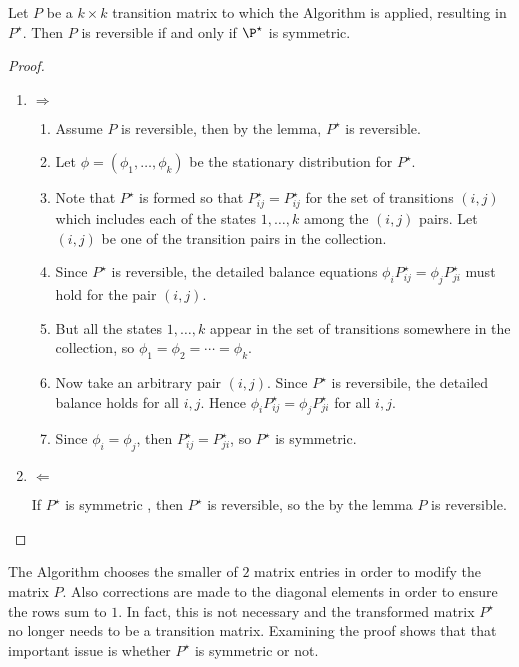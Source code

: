 \documentclass[12pt]{article}
\begin{document}
\begin{theorem}
  Let $P$ be a $k \times k$ transition matrix to which the Algorithm
  is applied, resulting in $P^{\star}$.  Then $P$ is reversible if and
  only if $\P^{\star}$ is symmetric.
\end{theorem}

\begin{proof}
  \begin{enumerate}
  \item $\Rightarrow$
    \begin{enumerate}
    \item Assume $P$ is reversible, then by the lemma, $P^{\star}$ is
      reversible.
    \item Let $\phi = (\phi_1, \dots, \phi_k)$ be the stationary
      distribution for $P^{\star}$.
    \item Note that $P^{\star}$ is formed so that $P_{ij}^{\star} =
      P_{ij}^{\star}$ for the set of transitions $(i,j)$ which
      includes each of the states $1, \dots, k$ among the $(i,j)$
      pairs.  Let $(i,j)$ be one of the transition pairs in the
      collection.
    \item Since $P^{\star}$ is reversible, the detailed balance
      equations  $\phi_i P_{ij}^{\star} = \phi_j
      P_{ji}^{\star}$ must hold for the pair $(i,j)$.
    \item But all the states $1, \dots, k$ appear in the set of
      transitions somewhere in the collection, so $\phi_1 = \phi_2 =
      \cdots = \phi_k$.
    \item Now take an arbitrary pair $(i,j)$.  Since $P^{\star}$ is
      reversibile, the detailed balance holds for all $i,j$.  Hence
      $\phi_i P_{ij}^{\star} = \phi_j P_{ji}^{\star}$ for all $i,j$.
    \item Since $\phi_i = \phi_j$, then $P_{ij}^{\star} =
      P_{ji}^{\star}$, so $P^{\star}$ is symmetric.
    \end{enumerate}
  \item $\Leftarrow$

    If $P^{\star}$ is symmetric , then $P^{\star}$ is reversible, so
    the by the lemma $P$ is reversible.
  \end{enumerate}
\end{proof}

\begin{remark}
  The Algorithm chooses the smaller of $2$ matrix entries in order to
  modify the matrix $P$.  Also corrections are made to the diagonal
  elements in order to ensure the rows sum to $1$.  In fact, this is
  not necessary and the transformed matrix $P^{\star}$ no longer needs
  to be a transition matrix.  Examining the proof shows that that
  important issue is whether $P^{\star}$ is symmetric or not.
\end{remark}
\end{document}
